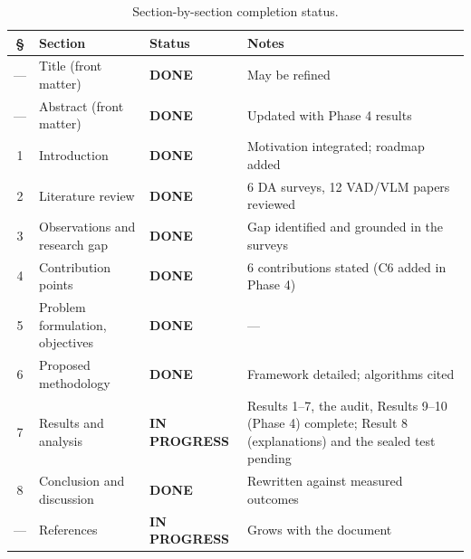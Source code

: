 \documentclass[a4paper,fleqn]{cas-sc}
\newcommand{\done}{{\sffamily\bfseries\color{donecol}DONE}}
\newcommand{\inprog}{{\sffamily\bfseries\color{pendingcol}IN PROGRESS}}
\begin{document}
\begin{table}[width=\linewidth,cols=4,pos=h]
\caption{Section-by-section completion status.}\label{tbl:status}
\begin{tabularx}{\linewidth}{@{}c l l Z@{}}
\toprule
\textbf{\S} & \textbf{Section} & \textbf{Status} & \textbf{Notes} \\
\midrule
--- & Title (front matter)             & \done       & May be refined \\
--- & Abstract (front matter)          & \done       & Updated with Phase 4 results \\
1   & Introduction                     & \done       & Motivation integrated; roadmap added \\
2   & Literature review                & \done       & 6 DA surveys, 12 VAD/VLM papers reviewed \\
3   & Observations and research gap    & \done       & Gap identified and grounded in the surveys \\
4   & Contribution points              & \done       & 6 contributions stated (C6 added in Phase 4) \\
5   & Problem formulation, objectives  & \done       & --- \\
6   & Proposed methodology             & \done       & Framework detailed; algorithms cited \\
7   & Results and analysis             & \inprog     & Results 1--7, the audit, Results 9--10 (Phase 4) complete; Result 8 (explanations) and the sealed test pending \\
8   & Conclusion and discussion        & \done       & Rewritten against measured outcomes \\
--- & References                       & \inprog     & Grows with the document \\
\bottomrule
\end{tabularx}
\end{table}
\end{document}
